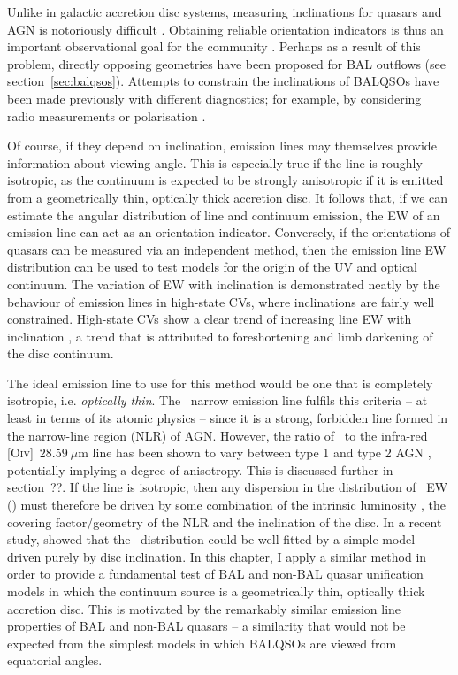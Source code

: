 Unlike in galactic accretion disc systems, measuring inclinations
for quasars and AGN is notoriously difficult \citep[see e.g.][]{marin2016}. 
Obtaining reliable orientation indicators is thus an important observational
goal for the community \citep[see e.g.][]{marin2016}. 
Perhaps as a result of this problem, 
directly opposing geometries have been proposed for 
BAL outflows (see section~\ref{sec:balqsos}). 
Attempts to constrain the inclinations
of BALQSOs have been made previously with
different diagnostics; for example, by considering 
radio measurements \citep{zhou2006,dipompeo2012a} or
polarisation \citep{brotherton2006}.  

Of course, if they depend on inclination, emission lines may themselves 
provide information about viewing angle. 
This is especially true if the line is roughly isotropic, as 
the continuum is expected to be strongly anisotropic if it is emitted from a 
geometrically thin, optically thick accretion disc. 
It follows that, if we can estimate the angular distribution of line and continuum emission,
the EW of an emission line can act as an orientation indicator. Conversely, if the orientations
of quasars can be measured via an independent method, 
then the emission line EW distribution can be used to test models
for the origin of the UV and optical continuum.
The variation of EW with inclination is demonstrated neatly by the behaviour 
of emission lines in high-state CVs, where inclinations are fairly well constrained.
High-state CVs show a clear trend of increasing line EW with inclination 
\citep[][see also sections~\ref{sec:NLs} and \ref{sec:modela_spectra}]{hessman1984,patterson1984,echevarria1988,noebauer},
a trend that is attributed to foreshortening and limb darkening of the disc continuum.

The ideal emission line to use for this method would be one that is completely isotropic,
i.e. {\em optically thin}. The \oiiifull\ narrow emission line fulfils this criteria -- at least in terms of its atomic physics -- since it 
is a strong, forbidden line formed in the narrow-line region (NLR) of AGN. However,
the ratio of \oiiifull\ to the infra-red [O\textsc{iv}]~$28.59~\mu$m line has been shown to
vary between type 1 and type 2 AGN \citep{kraemer2011}, potentially implying a degree of anisotropy.
This is discussed further in section~??.
If the line is isotropic, then any dispersion in the distribution of \oiiifull\ EW (\ewo) 
must therefore be driven by some combination of
the intrinsic luminosity \citep{borosongreen}, 
the covering factor/geometry of the NLR \citep{baskin2005} and the 
inclination of the disc. In a recent study, \citet{risaliti2011} showed that 
the \ewo\ distribution could be well-fitted by a simple model driven purely by disc inclination.
In this chapter, I apply a similar method in order to provide a fundamental test of
BAL and non-BAL quasar unification models in which the continuum source is a geometrically
thin, optically thick accretion disc. This is motivated by the remarkably similar
emission line properties of BAL and non-BAL quasars -- a similarity that would not
be expected from the simplest models in which BALQSOs are viewed from equatorial angles.

